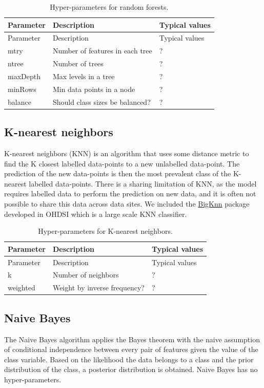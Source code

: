 \documentclass[11pt]{book}
\theoremstyle{definition}
\theoremstyle{definition}
\theoremstyle{definition}
\theoremstyle{remark}
\begin{document}
\begin{longtable}[]{@{}lll@{}}
\caption{\label{tab:randomForestParameters} Hyper-parameters for random forests.}\tabularnewline
\toprule
Parameter & Description & Typical values\tabularnewline
\midrule
\endfirsthead
\toprule
Parameter & Description & Typical values\tabularnewline
\midrule
\endhead
mtry & Number of features in each tree & ?\tabularnewline
ntree & Number of trees & ?\tabularnewline
maxDepth & Max levels in a tree & ?\tabularnewline
minRows & Min data points in a node & ?\tabularnewline
balance & Should class sizes be balanced? & ?\tabularnewline
\bottomrule
\end{longtable}

\hypertarget{k-nearest-neighbors}{%
\subsection{K-nearest neighbors}\label{k-nearest-neighbors}}

K-nearest neighbors (KNN) is an algorithm that uses some distance metric to find the K closest labelled data-points to a new unlabelled data-point. The prediction of the new data-points is then the most prevalent class of the K-nearest labelled data-points. There is a sharing limitation of KNN, as the model requires labelled data to perform the prediction on new data, and it is often not possible to share this data across data sites. We included the \href{https://github.com/OHDSI/BigKnn}{BigKnn} package developed in OHDSI which is a large scale KNN classifier.  

\begin{longtable}[]{@{}lll@{}}
\caption{\label{tab:knnParameters} Hyper-parameters for K-nearest neighbors.}\tabularnewline
\toprule
Parameter & Description & Typical values\tabularnewline
\midrule
\endfirsthead
\toprule
Parameter & Description & Typical values\tabularnewline
\midrule
\endhead
k & Number of neighbors & ?\tabularnewline
weighted & Weight by inverse frequency? & ?\tabularnewline
\bottomrule
\end{longtable}

\hypertarget{naive-bayes}{%
\subsection{Naive Bayes}\label{naive-bayes}}

The Naive Bayes algorithm applies the Bayes theorem with the naive assumption of conditional independence between every pair of features given the value of the class variable. Based on the likelihood the data belongs to a class and the prior distribution of the class, a posterior distribution is obtained. Naive Bayes has no hyper-parameters. 
\end{document}
